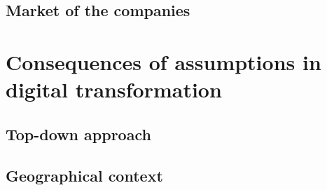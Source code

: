 \documentclass[a4]{scrartcl}
\begin{document}
\subsection{Market of the companies} \label{subsec:market_assumptions}











\section{Consequences of assumptions in digital transformation} \label{sec:Sec2}












\subsection{Top-down approach} \label{subsec:topdown_consequences}









\subsection{Geographical context} \label{subsec:geoconsequences}


\end{document}
